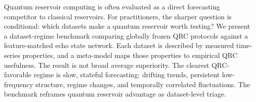 Quantum reservoir computing is often evaluated as a direct forecasting competitor to classical reservoirs. For practitioners, the sharper question is conditional: which datasets make a quantum reservoir worth testing? We present a dataset-regime benchmark comparing globally frozen QRC protocols against a feature-matched echo state network. Each dataset is described by measured time-series properties, and a meta-model maps those properties to empirical QRC usefulness. The result is not broad average superiority. The clearest QRC-favorable regime is slow, stateful forecasting: drifting trends, persistent low-frequency structure, regime changes, and temporally correlated fluctuations. The benchmark reframes quantum reservoir advantage as dataset-level triage.

